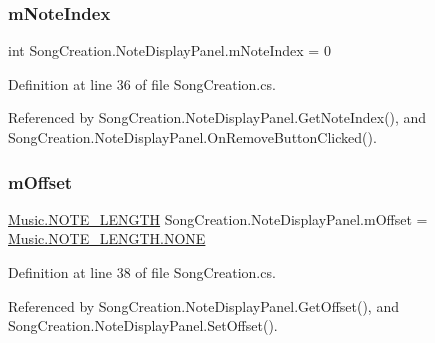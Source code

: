 \subsubsection{\texorpdfstring{m\+Note\+Index}{mNoteIndex}}
{\footnotesize\ttfamily int Song\+Creation.\+Note\+Display\+Panel.\+m\+Note\+Index = 0\hspace{0.3cm}{\ttfamily [private]}}



Definition at line 36 of file Song\+Creation.\+cs.



Referenced by Song\+Creation.\+Note\+Display\+Panel.\+Get\+Note\+Index(), and Song\+Creation.\+Note\+Display\+Panel.\+On\+Remove\+Button\+Clicked().

\mbox{\label{class_song_creation_1_1_note_display_panel_ae1943fcafd54133bbc3e387cc49473b8}} 
\subsubsection{\texorpdfstring{m\+Offset}{mOffset}}
{\footnotesize\ttfamily \hyperlink{group___music_enums_gaf11b5f079adbb21c800b9eca1c5c3cbd}{Music.\+N\+O\+T\+E\+\_\+\+L\+E\+N\+G\+TH} Song\+Creation.\+Note\+Display\+Panel.\+m\+Offset = \hyperlink{group___music_enums_ggaf11b5f079adbb21c800b9eca1c5c3cbdab50339a10e1de285ac99d4c3990b8693}{Music.\+N\+O\+T\+E\+\_\+\+L\+E\+N\+G\+T\+H.\+N\+O\+NE}\hspace{0.3cm}{\ttfamily [private]}}



Definition at line 38 of file Song\+Creation.\+cs.



Referenced by Song\+Creation.\+Note\+Display\+Panel.\+Get\+Offset(), and Song\+Creation.\+Note\+Display\+Panel.\+Set\+Offset().

\mbox{\label{class_song_creation_1_1_note_display_panel_a9a63fa0205fec1d90c093ad4174aed00}} 
